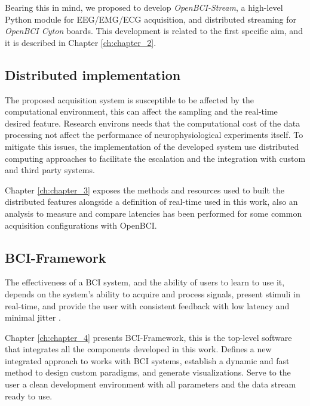 Bearing this in mind, we proposed to develop \textit{OpenBCI-Stream}, a high-level Python module for \gls*{EEG}/\gls*{EMG}/\gls*{ECG} acquisition, and distributed streaming for \textit{OpenBCI Cyton} boards. This development is related to the first specific aim, and it is described in Chapter \ref{ch:chapter_2}.

\subsection{Distributed implementation}

{\color {Nessa}
The proposed acquisition system is susceptible to be affected by the computational environment, this can affect the sampling and the real-time desired feature. Research environs needs that the computational cost of the data processing not affect the performance of neurophysiological experiments itself. To mitigate this issues, the implementation of the developed system use distributed computing approaches to facilitate the escalation and the integration with custom and third party systems. 

Chapter \ref{ch:chapter_3} exposes the methods and resources used to built the distributed features alongside a definition of real-time used in this work, also an analysis to measure and compare latencies has been performed for some common acquisition configurations with OpenBCI.
}

\subsection{\gls*{BCI}-Framework}

{\color {Nessa}
The effectiveness of a BCI system, and the ability of users to learn to use it, depends on the system's ability to acquire and process signals, present stimuli in real-time, and provide the user with consistent feedback with low latency and minimal jitter \cite{wilson2010procedure}. 

Chapter \ref{ch:chapter_4} presents BCI-Framework, this is the top-level software that integrates all the components developed in this work. Defines a new integrated approach to works with BCI systems, establish a dynamic and fast method to design custom paradigms, and generate visualizations. Serve to the user a clean development environment with all parameters and the data stream ready to use.
}


